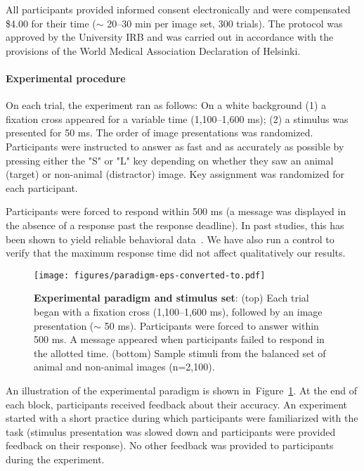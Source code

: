 \documentclass{article}
\begin{document}
All participants provided informed consent electronically and were compensated \$4.00 for their time ($\sim$ 20–30 min per image set, 300 trials). The protocol was approved by the University IRB and was carried out in accordance with the provisions of the World Medical Association Declaration of Helsinki.


\paragraph{Experimental procedure}

On each trial, the experiment ran as follows: On a white background (1) a fixation cross appeared for a variable time (1,100--1,600 ms); (2) a stimulus was presented for 50 ms. The order of image presentations was randomized. Participants were instructed to answer as fast and as accurately as possible by pressing either the "S" or "L" key depending on whether they saw an animal (target) or non-animal (distractor) image. Key assignment was randomized for each participant. 

Participants were forced to respond within 500 ms (a message was displayed in the absence of a response past the response deadline). In past studies, this has been shown to yield reliable behavioral data~\citep[e.g.][]{Sofer2015}. We have also run a control to verify that the maximum response time did not affect qualitatively our results.

\begin{figure}[t!]
  \begin{center}
    \texttt{[image: figures/paradigm-eps-converted-to.pdf]}
    \caption[Experimental paradigm]{\textbf{Experimental paradigm and stimulus set}: (top) Each trial began with a fixation cross (1,100--1,600 ms), followed by an image presentation ($\sim$ 50 ms). Participants were forced to answer within 500 ms. A message appeared when participants failed to respond in the allotted time. (bottom) Sample stimuli from the balanced set of animal and non-animal images  (n=2,100). 
    \label{fig:methods:paradigm}}
  \end{center}
\end{figure}

An illustration of the experimental paradigm is shown in~Figure~\ref{fig:methods:paradigm}. At the end of each block, participants received feedback about their accuracy. An experiment started with a short practice during which participants were familiarized with the task (stimulus presentation was slowed down and participants were provided feedback on their response). No other feedback was provided to participants during the experiment. 
\end{document}
